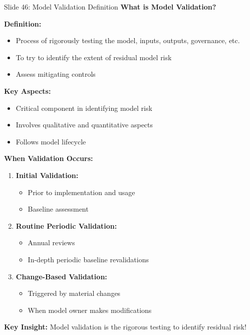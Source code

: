 \documentclass[8pt]{beamer}
\begin{document}
	
	\begin{frame}{Slide 46: Model Validation Definition}
		\fontsize{6.5}{7.5}\selectfont
		\textbf{What is Model Validation?}
		
		\vspace{0.1cm}
		\textbf{Definition:}
		\begin{itemize}
			\item Process of rigorously testing the model, inputs, outputs, governance, etc.
			\item To try to identify the extent of residual model risk
			\item Assess mitigating controls
		\end{itemize}
		
		\vspace{0.1cm}
		\textbf{Key Aspects:}
		\begin{itemize}
			\item Critical component in identifying model risk
			\item Involves qualitative and quantitative aspects
			\item Follows model lifecycle
		\end{itemize}
		
		\vspace{0.1cm}
		\textbf{When Validation Occurs:}
		\begin{enumerate}
			\item \textbf{Initial Validation:}
			\begin{itemize}
				\item Prior to implementation and usage
				\item Baseline assessment
			\end{itemize}
			\item \textbf{Routine Periodic Validation:}
			\begin{itemize}
				\item Annual reviews
				\item In-depth periodic baseline revalidations
			\end{itemize}
			\item \textbf{Change-Based Validation:}
			\begin{itemize}
				\item Triggered by material changes
				\item When model owner makes modifications
			\end{itemize}
		\end{enumerate}
		
		\textcolor{myblue}{\textbf{Key Insight:}} Model validation is the \textcolor{myblue}{rigorous testing to identify residual risk}!
	\end{frame}
	
\end{document}
